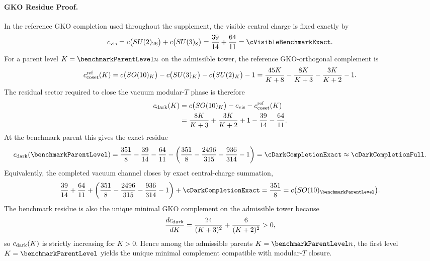 \documentclass[11pt]{article}
\begin{document}
\paragraph*{GKO Residue Proof.}
In the reference GKO completion used throughout the supplement, the visible central charge is fixed exactly by
\begin{equation}
 c_{\rm vis}
 =
 c\bigl(SU(2)_{26}\bigr)+c\bigl(SU(3)_8\bigr)
 =
 \frac{39}{14}+\frac{64}{11}
 =
 \cVisibleBenchmarkExact.
\end{equation}
For a parent level $K=\benchmarkParentLevel n$ on the admissible tower, the reference GKO-orthogonal complement is
\begin{equation}
 c_{\rm coset}^{\rm ref}(K)
 =
 c\bigl(SO(10)_K\bigr)-c\bigl(SU(3)_K\bigr)-c\bigl(SU(2)_K\bigr)-1
 =
 \frac{45K}{K+8}-\frac{8K}{K+3}-\frac{3K}{K+2}-1.
\end{equation}
The residual sector required to close the vacuum modular-$T$ phase is therefore
\begin{align}
 c_{\rm dark}(K)
 &=
 c\bigl(SO(10)_K\bigr)-c_{\rm vis}-c_{\rm coset}^{\rm ref}(K) \\
 &=
 \frac{8K}{K+3}+\frac{3K}{K+2}+1-\frac{39}{14}-\frac{64}{11}.
\end{align}
At the benchmark parent this gives the exact residue
\begin{equation}
 c_{\rm dark}(\benchmarkParentLevel)
 =
 \frac{351}{8}-\frac{39}{14}-\frac{64}{11}
 -\left(\frac{351}{8}-\frac{2496}{315}-\frac{936}{314}-1\right)
 =
 \cDarkCompletionExact
 \approx
 \cDarkCompletionFull.
\end{equation}
Equivalently, the completed vacuum channel closes by exact central-charge summation,
\begin{equation}
 \frac{39}{14}+\frac{64}{11}
 +\left(\frac{351}{8}-\frac{2496}{315}-\frac{936}{314}-1\right)
 +\cDarkCompletionExact
 =
 \frac{351}{8}
 =
 c\bigl(SO(10)_{\benchmarkParentLevel}\bigr).
\end{equation}
The benchmark residue is also the unique minimal GKO complement on the admissible tower because
\begin{equation}
 \frac{d c_{\rm dark}}{dK}
 =
 \frac{24}{(K+3)^2}+\frac{6}{(K+2)^2}
 >0,
\end{equation}
so $c_{\rm dark}(K)$ is strictly increasing for $K>0$. Hence among the admissible parents $K=\benchmarkParentLevel n$, the first level $K=\benchmarkParentLevel$ yields the unique minimal complement compatible with modular-$T$ closure.
\end{document}

